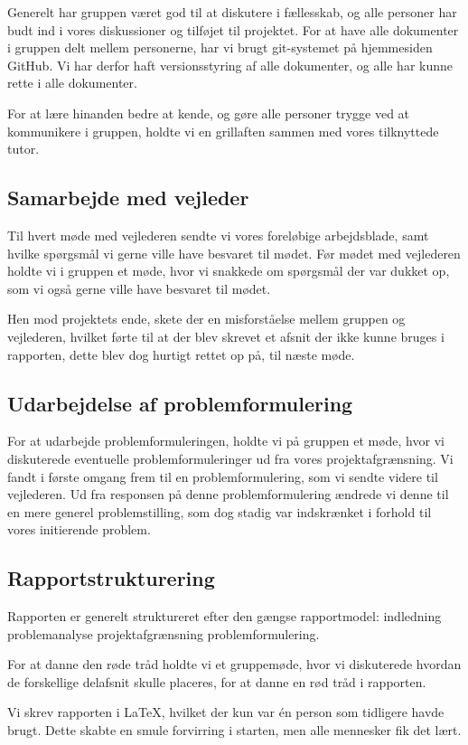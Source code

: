 Generelt har gruppen været god til at diskutere i fællesskab, og alle personer har budt ind i vores diskussioner og tilføjet til projektet. For at have alle dokumenter i gruppen delt mellem personerne, har vi brugt git-systemet på hjemmesiden GitHub. Vi har derfor haft versionsstyring af alle dokumenter, og alle har kunne rette i alle dokumenter. 

For at lære hinanden bedre at kende, og gøre alle personer trygge ved at kommunikere i gruppen, holdte vi en grillaften sammen med vores tilknyttede tutor. 

\subsection*{Samarbejde med vejleder}
Til hvert møde med vejlederen sendte vi vores foreløbige arbejdsblade, samt hvilke spørgsmål vi gerne ville have besvaret til mødet. Før mødet med vejlederen holdte vi i gruppen et møde, hvor vi snakkede om spørgsmål der var dukket op, som vi også gerne ville have besvaret til mødet. 

Hen mod projektets ende, skete der en misforståelse mellem gruppen og vejlederen, hvilket førte til at der blev skrevet et afsnit der ikke kunne bruges i rapporten, dette blev dog hurtigt rettet op på, til næste møde.

\subsection*{Udarbejdelse af problemformulering}
For at udarbejde problemformuleringen, holdte vi på gruppen et møde, hvor vi diskuterede eventuelle problemformuleringer ud fra vores projektafgrænsning. Vi fandt i første omgang frem til en problemformulering, som vi sendte videre til vejlederen. Ud fra responsen på denne problemformulering ændrede vi denne til en mere generel problemstilling, som dog stadig var indskrænket i forhold til vores initierende problem.

\subsection*{Rapportstrukturering}
Rapporten er generelt struktureret efter den gængse rapportmodel: indledning \textrightarrow problemanalyse \textrightarrow projektafgrænsning \textrightarrow problemformulering. 

For at danne den røde tråd holdte vi et gruppemøde, hvor vi diskuterede hvordan de forskellige delafsnit skulle placeres, for at danne en rød tråd i rapporten.

Vi skrev rapporten i \LaTeX, hvilket der kun var \'en person som tidligere havde brugt. Dette skabte en smule forvirring i starten, men alle mennesker fik det lært.